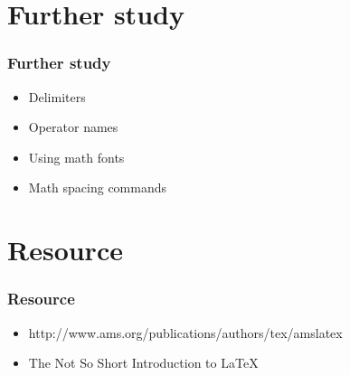 \documentclass[12pt]{beamer}
\begin{document}
\section{Further study}
\begin{frame}
\frametitle{Further study}
\begin{itemize}
  \item Delimiters
  \item Operator names
  \item Using math fonts
  \item Math spacing commands
\end{itemize}
\end{frame}

\section{Resource}
\begin{frame}
\frametitle{Resource}
\begin{itemize}
  \item \footnotesize{http://www.ams.org/publications/authors/tex/amslatex}
  \item \footnotesize{The Not So Short Introduction to \LaTeX{}}
\end{itemize}
\end{frame}
\end{document}
